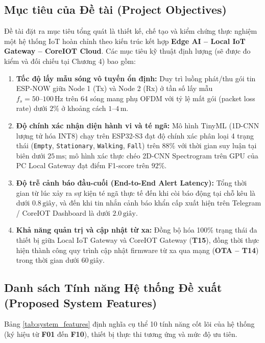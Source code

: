 \documentclass{hcmut-report}
\begin{document}
\subsection[Mục tiêu của Đề tài]{Mục tiêu của Đề tài (Project Objectives)}
Đề tài đặt ra mục tiêu tổng quát là thiết kế, chế tạo và kiểm chứng thực nghiệm một hệ thống IoT hoàn chỉnh theo kiến trúc kết hợp \textbf{Edge AI -- Local IoT Gateway -- CoreIOT Cloud}. Các mục tiêu kỹ thuật định lượng (sẽ được đo kiểm và đối chiếu tại Chương 4) bao gồm:
\begin{enumerate}
  \item \textbf{Tốc độ lấy mẫu sóng vô tuyến ổn định:} Duy trì luồng phát/thu gói tin ESP-NOW giữa Node 1 (Tx) và Node 2 (Rx) ở tần số lấy mẫu $f_s = 50\text{--}100\,\text{Hz}$ trên 64 sóng mang phụ OFDM với tỷ lệ mất gói (packet loss rate) dưới $2\%$ ở khoảng cách $1\text{--}4\,\text{m}$.
  \item \textbf{Độ chính xác nhận diện hành vi và té ngã:} Mô hình TinyML (1D-CNN lượng tử hóa INT8) chạy trên ESP32-S3 đạt độ chính xác phân loại 4 trạng thái (\texttt{Empty}, \texttt{Stationary}, \texttt{Walking}, \texttt{Fall}) trên $88\%$ với thời gian suy luận tại biên dưới $25\,\text{ms}$; mô hình xác thực chéo 2D-CNN Spectrogram trên GPU của PC Local Gateway đạt điểm F1-score trên $92\%$.
  \item \textbf{Độ trễ cảnh báo đầu-cuối (End-to-End Alert Latency):} Tổng thời gian từ lúc xảy ra sự kiện té ngã thực tế đến khi còi báo động tại chỗ kêu là dưới $0.8\,\text{giây}$, và đến khi tin nhắn cảnh báo khẩn cấp xuất hiện trên Telegram / CoreIOT Dashboard là dưới $2.0\,\text{giây}$.
  \item \textbf{Khả năng quản trị và cập nhật từ xa:} Đồng bộ hóa 100\% trạng thái đa thiết bị giữa Local IoT Gateway và CoreIOT Gateway (\textbf{T15}), đồng thời thực hiện thành công quy trình cập nhật firmware từ xa qua mạng (\textbf{OTA -- T14}) trong thời gian dưới $60\,\text{giây}$.
\end{enumerate}

\subsection[Danh sách Tính năng Hệ thống Đề xuất]{Danh sách Tính năng Hệ thống Đề xuất (Proposed System Features)}
Bảng \ref{tab:system_features} định nghĩa cụ thể 10 tính năng cốt lõi của hệ thống (ký hiệu từ \textbf{F01} đến \textbf{F10}), thiết bị thực thi tương ứng và mức độ ưu tiên.
\end{document}
